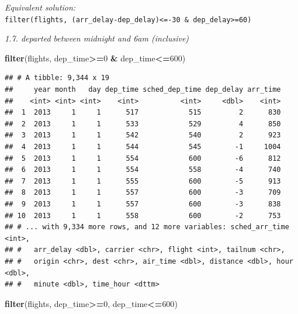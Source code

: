\documentclass[]{book}
\newenvironment{Shaded}{\begin{snugshade}}{\end{snugshade}}
\newcommand{\DecValTok}[1]{\textcolor[rgb]{0.00,0.00,0.81}{#1}}
\newcommand{\KeywordTok}[1]{\textcolor[rgb]{0.13,0.29,0.53}{\textbf{#1}}}
\newcommand{\NormalTok}[1]{#1}
\newcommand{\OperatorTok}[1]{\textcolor[rgb]{0.81,0.36,0.00}{\textbf{#1}}}
\newcommand{\StringTok}[1]{\textcolor[rgb]{0.31,0.60,0.02}{#1}}
\theoremstyle{definition}
\theoremstyle{definition}
\theoremstyle{definition}
\theoremstyle{remark}
\begin{document}
\emph{Equivalent solution:}\\
\texttt{filter(flights,\ (arr\_delay-dep\_delay)\textless{}=-30\ \&\ dep\_delay\textgreater{}=60)}

\emph{1.7. departed between midnight and 6am (inclusive)}

\begin{Shaded}
\begin{Highlighting}[]
\KeywordTok{filter}\NormalTok{(flights, dep_time}\OperatorTok{>=}\DecValTok{0} \OperatorTok{&}\StringTok{ }\NormalTok{dep_time}\OperatorTok{<=}\DecValTok{600}\NormalTok{)}
\end{Highlighting}
\end{Shaded}

\begin{verbatim}
## # A tibble: 9,344 x 19
##     year month   day dep_time sched_dep_time dep_delay arr_time
##    <int> <int> <int>    <int>          <int>     <dbl>    <int>
##  1  2013     1     1      517            515         2      830
##  2  2013     1     1      533            529         4      850
##  3  2013     1     1      542            540         2      923
##  4  2013     1     1      544            545        -1     1004
##  5  2013     1     1      554            600        -6      812
##  6  2013     1     1      554            558        -4      740
##  7  2013     1     1      555            600        -5      913
##  8  2013     1     1      557            600        -3      709
##  9  2013     1     1      557            600        -3      838
## 10  2013     1     1      558            600        -2      753
## # ... with 9,334 more rows, and 12 more variables: sched_arr_time <int>,
## #   arr_delay <dbl>, carrier <chr>, flight <int>, tailnum <chr>,
## #   origin <chr>, dest <chr>, air_time <dbl>, distance <dbl>, hour <dbl>,
## #   minute <dbl>, time_hour <dttm>
\end{verbatim}

\begin{Shaded}
\begin{Highlighting}[]
\KeywordTok{filter}\NormalTok{(flights, dep_time}\OperatorTok{>=}\DecValTok{0}\NormalTok{, dep_time}\OperatorTok{<=}\DecValTok{600}\NormalTok{)}
\end{Highlighting}
\end{Shaded}
\end{document}
